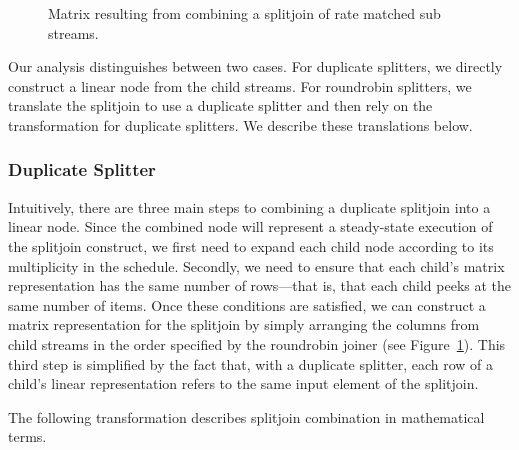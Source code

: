 {\begin{figure}[t]
\center
\epsfxsize=3.2in
\caption{Matrix resulting from combining a splitjoin of rate matched sub streams.
\protect\label{fig:splitjoin-duplicate-matrix}}
\vspace{-12pt}
\end{figure}

Our analysis distinguishes between two cases. For duplicate splitters,
we directly construct a linear node from the child streams.  For
roundrobin splitters, we translate the splitjoin to use a duplicate
splitter and then rely on the transformation for duplicate splitters.
We describe these translations below.

\subsubsection{Duplicate Splitter}

Intuitively, there are three main steps to combining a duplicate
splitjoin into a linear node.  Since the combined node will represent
a steady-state execution of the splitjoin construct, we first need to
expand each child node according to its multiplicity in the schedule.
Secondly, we need to ensure that each child's matrix representation
has the same number of rows---that is, that each child peeks at the
same number of items.  Once these conditions are satisfied, we can
construct a matrix representation for the splitjoin by simply
arranging the columns from child streams in the order specified by the
roundrobin joiner (see Figure~\ref{fig:splitjoin-duplicate-matrix}).
This third step is simplified by the fact that, with a duplicate
splitter, each row of a child's linear representation refers to the
same input element of the splitjoin.

The following transformation describes splitjoin combination in
mathematical terms.


}
